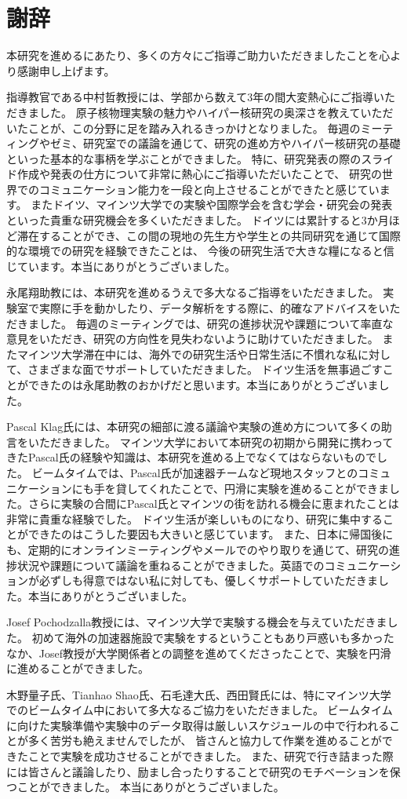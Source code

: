 \documentclass[a4paper,11pt,uplatex]{jsbook}
\begin{document}
\chapter*{謝辞}
本研究を進めるにあたり、多くの方々にご指導ご助力いただきましたことを心より感謝申し上げます。

指導教官である中村哲教授には、学部から数えて3年の間大変熱心にご指導いただきました。
原子核物理実験の魅力やハイパー核研究の奥深さを教えていただいたことが、この分野に足を踏み入れるきっかけとなりました。
毎週のミーティングやゼミ、研究室での議論を通じて、研究の進め方やハイパー核研究の基礎といった基本的な事柄を学ぶことができました。
特に、研究発表の際のスライド作成や発表の仕方について非常に熱心にご指導いただいたことで、
研究の世界でのコミュニケーション能力を一段と向上させることができたと感じています。
またドイツ、マインツ大学での実験や国際学会を含む学会・研究会の発表といった貴重な研究機会を多くいただきました。
ドイツには累計すると3か月ほど滞在することができ、この間の現地の先生方や学生との共同研究を通じて国際的な環境での研究を経験できたことは、
今後の研究生活で大きな糧になると信じています。本当にありがとうございました。

永尾翔助教には、本研究を進めるうえで多大なるご指導をいただきました。
実験室で実際に手を動かしたり、データ解析をする際に、的確なアドバイスをいただきました。
毎週のミーティングでは、研究の進捗状況や課題について率直な意見をいただき、研究の方向性を見失わないように助けていただきました。
またマインツ大学滞在中には、海外での研究生活や日常生活に不慣れな私に対して、さまざまな面でサポートしていただきました。
ドイツ生活を無事過ごすことができたのは永尾助教のおかげだと思います。本当にありがとうございました。



Pascal Klag氏には、本研究の細部に渡る議論や実験の進め方について多くの助言をいただきました。
マインツ大学において本研究の初期から開発に携わってきたPascal氏の経験や知識は、本研究を進める上でなくてはならないものでした。
ビームタイムでは、Pascal氏が加速器チームなど現地スタッフとのコミュニケーションにも手を貸してくれたことで、円滑に実験を進めることができました。さらに実験の合間にPascal氏とマインツの街を訪れる機会に恵まれたことは非常に貴重な経験でした。
ドイツ生活が楽しいものになり、研究に集中することができたのはこうした要因も大きいと感じています。
また、日本に帰国後にも、定期的にオンラインミーティングやメールでのやり取りを通じて、研究の進捗状況や課題について議論を重ねることができました。英語でのコミュニケーションが必ずしも得意ではない私に対しても、優しくサポートしていただきました。本当にありがとうございました。

Josef Pochodzalla教授には、マインツ大学で実験する機会を与えていただきました。
初めて海外の加速器施設で実験をするということもあり戸惑いも多かったなか、Josef教授が大学関係者との調整を進めてくださったことで、実験を円滑に進めることができました。

木野量子氏、Tianhao Shao氏、石毛達大氏、西田賢氏には、特にマインツ大学でのビームタイム中において多大なるご協力をいただきました。
ビームタイムに向けた実験準備や実験中のデータ取得は厳しいスケジュールの中で行われることが多く苦労も絶えませんでしたが、
皆さんと協力して作業を進めることができたことで実験を成功させることができました。
また、研究で行き詰まった際には皆さんと議論したり、励まし合ったりすることで研究のモチベーションを保つことができました。
本当にありがとうございました。
\end{document}
